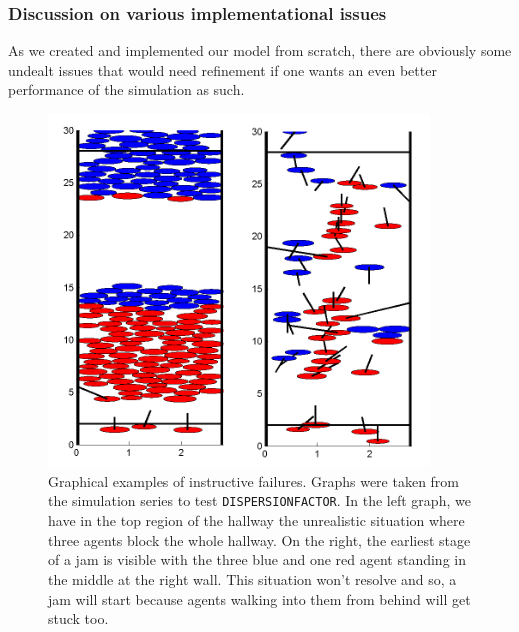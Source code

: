 \noi 




\subsubsection{Discussion on various implementational issues}
As we created and implemented our model from scratch, there are obviously some undealt issues that would need refinement if one wants an even better performance of the simulation as such.\\

\begin{figure}[h!]
	\centering
		\includegraphics[width=0.90\textwidth]{pictures/exFails}
	\caption{Graphical examples of instructive failures. Graphs were taken from the simulation series to test \texttt{DISPERSIONFACTOR}. In the left graph, we have in the top region of the hallway the unrealistic situation where three agents block the whole hallway. On the right, the earliest stage of a jam is visible with the three blue and one red agent standing in the middle at the right wall. This situation won't resolve and so, a jam will start because agents walking into them from behind will get stuck too.}
	\label{fig:exFails}
\end{figure}


